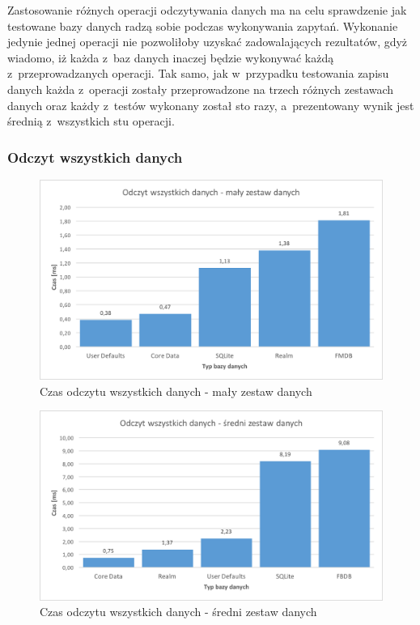 Zastosowanie różnych operacji odczytywania danych ma na celu sprawdzenie jak testowane bazy danych radzą sobie podczas wykonywania zapytań. Wykonanie jedynie jednej operacji nie pozwoliłoby uzyskać zadowalających rezultatów, gdyż wiadomo, iż każda z~baz danych inaczej będzie wykonywać każdą z~przeprowadzanych operacji. Tak samo, jak w~przypadku testowania zapisu danych każda z~operacji zostały przeprowadzone na trzech różnych zestawach danych oraz każdy z~testów wykonany został sto razy, a~prezentowany wynik jest średnią z~wszystkich stu operacji. 

\newpage

\subsubsection{Odczyt wszystkich danych}

\begin{figure}[h]
\centering
	\includegraphics[width=13.5cm]{img/read_data/read_all/read_all_test_small.png}
	\caption{Czas odczytu wszystkich danych - mały zestaw danych}
	\label{fig: read-data-small}
\end{figure}

\begin{figure}[h]
\centering
	\includegraphics[width=13.5cm]{img/read_data/read_all/read_all_test_medium.png}
	\caption{Czas odczytu wszystkich danych - średni zestaw danych}
	\label{fig: read-data-medium}
\end{figure}

